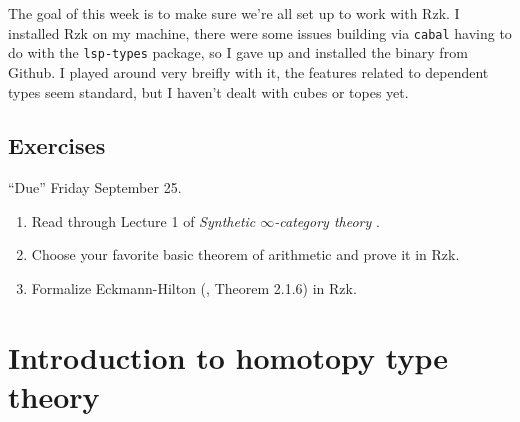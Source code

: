 \documentclass[10pt]{article}
\begin{document}
The goal of this week is to make sure we're all set up to work with Rzk.
I installed Rzk on my machine, there were some issues building via \texttt{cabal} having to do with the \texttt{lsp-types} package, so I gave up and installed the binary from Github.
I played around very breifly with it, the features related to dependent types seem standard, but I haven't dealt with cubes or topes yet.

\subsection*{Exercises}

\enquote{Due} Friday September 25.

\begin{enumerate}
\item Read through Lecture 1 of \textit{Synthetic $\infty$-category theory} \cite{weinberger-2026}.
\item Choose your favorite basic theorem of arithmetic and prove it in Rzk.
\item Formalize Eckmann-Hilton (\cite{hottbook}, Theorem 2.1.6) in Rzk.
\end{enumerate}

\section{Introduction to homotopy type theory}
\end{document}
